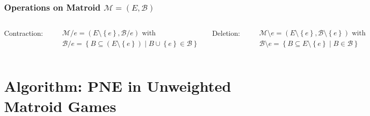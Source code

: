 \documentclass{beamer}
\newcommand{\tupel}[1]{\left(#1\right)}
\newcommand{\set}[1]{\left\{#1\right\}}
\begin{document}
\begin{frame}
  \frametitle{Operations on Matroid $\mathcal{M} = \tupel{E, \mathcal{B}}$}
  \begin{columns}
    \begin{center}
      Contraction:
    \end{center}
    \vspace{-0.6cm}
    \begin{align*}
      &\mathcal{M}/e = \tupel{E\setminus\set{e}, \mathcal{B}/e}\text{ with}\\
      &\mathcal{B}/e = \set{B\subseteq (E\setminus\set{e})\middle| B\cup\set{e}\in\mathcal{B}}
    \end{align*}
    \column<4->{0.5\textwidth}
    \begin{center}
      Deletion:
    \end{center}
    \vspace{-0.6cm}
    \begin{align*}
      &\mathcal{M}\setminus e = \tupel{E\setminus\set{e},\mathcal{B}\setminus \set{e}}\text{ with}\\
      &\mathcal{B}\setminus e = \set{B\subseteq E\setminus\set{e}\middle|B\in\mathcal{B}}
    \end{align*}
  \end{columns}
  \begin{center}
  \end{center}
\end{frame}

\section{Algorithm: PNE in Unweighted Matroid Games}
\end{document}
